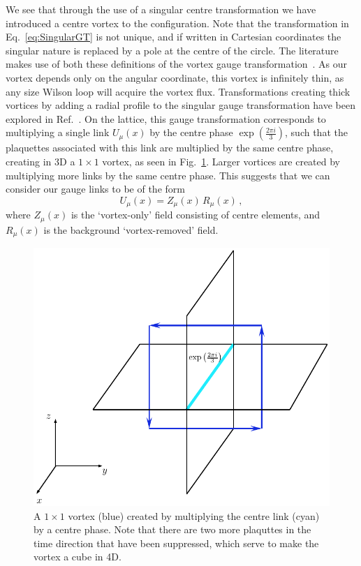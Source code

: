 We see that through the use of a singular centre transformation we have introduced a  centre vortex to the configuration. Note that the transformation in Eq.~\ref{eq:SingularGT} is not unique, and if written in Cartesian coordinates the singular nature is replaced by a pole at the centre of the circle. The literature makes use of both these definitions of the vortex gauge transformation~\cite{'tHooft:1977hy,Faber:1999gu}. As our vortex depends only on the angular coordinate, this vortex is infinitely thin, as any size Wilson loop will acquire the vortex flux. Transformations creating thick vortices by adding a radial profile to the singular gauge transformation have been explored in Ref.~\cite{Faber:1997rp}. On the lattice, this gauge transformation corresponds to multiplying a single link $U_\mu(x)$ by the centre phase $\exp\left(\frac{2\pi i}{3}\right)$, such that the plaquettes associated with this link are multiplied by the same centre phase, creating in 3D a $1\times 1$ vortex, as seen in Fig.~\ref{fig:CreatedVortex}. Larger vortices are created by multiplying more links by the same centre phase. This suggests that we can consider our gauge links to be of the form
%
\begin{equation}
U_\mu(x) = Z_\mu(x)\,R_\mu(x)\, ,
\label{eq:VortexDecomposition}
\end{equation}
%
where $Z_\mu(x)$ is the `vortex-only' field consisting of centre elements, and $R_\mu(x)$ is the background `vortex-removed' field.\\
%
\begin{figure}[htb!]
\centering
\includegraphics[width=0.7\linewidth]{./CreatedVortex.pdf}
\caption{\label{fig:CreatedVortex} A $1\times 1$ vortex (blue) created by multiplying the centre link (cyan) by a centre phase. Note that there are two more plaquttes in the time direction that have been suppressed, which serve to make the vortex a cube in 4D.}
\end{figure}
%

